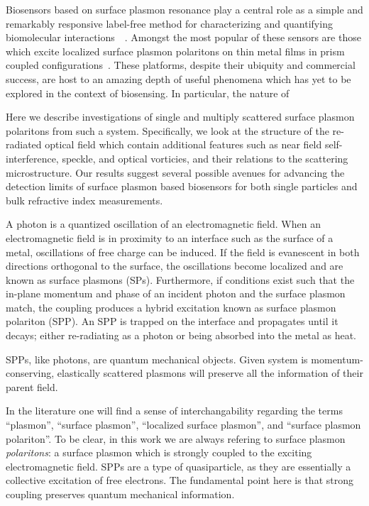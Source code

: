 Biosensors based on surface plasmon resonance play a central role as a
simple and remarkably responsive label-free method for characterizing and
quantifying biomolecular
interactions~\cite{homola1999surface}~\cite{homola2006surface}.  Amongst
the most popular of these sensors are those which excite localized surface
plasmon polaritons on thin metal films in prism coupled
configurations~\cite{hoa2007towards}.  These platforms, despite their
ubiquity and commercial success, are host to an amazing depth of useful
phenomena which has yet to be explored in the context of biosensing.  In
particular, the nature of 

Here
we describe investigations of single and multiply scattered surface
plasmon polaritons from such a system.  Specifically, we look at the
structure of the re-radiated optical field which contain additional
features such as near field self-interference, speckle, and optical
vorticies, and their relations to the scattering microstructure.  Our
results suggest several possible avenues for advancing the 
detection limits of surface plasmon based biosensors for both single
particles and bulk refractive index measurements.

A photon is a quantized oscillation of an electromagnetic field.  When an
electromagnetic  field is in proximity to an interface such as the surface
of a metal, oscillations of free charge can be induced.  If the field is
evanescent in both directions orthogonal to the surface, the oscillations
become localized and are known as surface plasmons (SPs).  Furthermore, if
conditions exist such that the in-plane momentum and phase of an incident
photon and the surface plasmon match, the coupling produces a hybrid
excitation known as surface plasmon polariton (SPP).  An SPP is trapped on
the interface and propagates until it decays; either re-radiating as a
photon or being absorbed into the metal as heat.

SPPs, like photons, are quantum mechanical objects.  Given system is
momentum-conserving, elastically scattered plasmons will preserve all the
information of their parent field.  

In the literature one will find a sense of interchangability regarding
the terms ``plasmon'', ``surface plasmon'', ``localized surface plasmon'',
and ``surface plasmon polariton''.  To be clear, in this work we are always
refering to surface plasmon \textit{polaritons}: a surface plasmon which is
strongly coupled to the exciting electromagnetic field.  SPPs are a type of
quasiparticle, as they are essentially a collective excitation of free
electrons.  The fundamental point here is that strong coupling preserves
quantum mechanical information.

